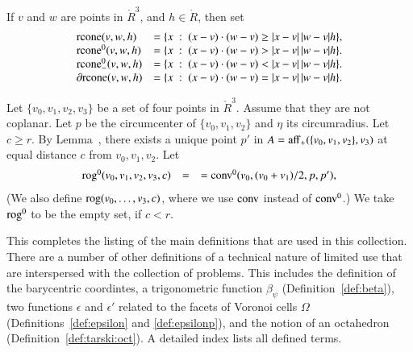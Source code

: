 \begin{tarskidata}
\begin{tarski}
\begin{definition}[rcone] 
If $v$ and $w$ are points in $\ring{R}^3$, and
  $h\in\ring{R}$, then set
  $$\begin{array}{lll}
    {\operatorname{rcone}}(v,w,h) &= \{x\ :\  (x-v)\cdot (w-v) \ge |x-v|\,|w-v| h\},\\
    {\operatorname{rcone}}^0(v,w,h) &= \{x\ :\  (x-v)\cdot (w-v) > |x-v|\,|w-v| h\}.\\
    {\operatorname{rcone}}_-^0(v,w,h) &= \{x\ :\  (x-v)\cdot (w-v) < |x-v|\,|w-v| h\}.\\
    \partial{\operatorname{rcone}}(v,w,h) &= \{x\ :\  (x-v)\cdot (w-v) = |x-v|\,|w-v| h\}.\\
    \end{array}
    $$
\end{definition}
\end{tarski}


\begin{tarski}

\begin{definition} 
Let $\{v_0,v_1,v_2,v_3\}$ be a set of four points in $\ring{R}^3$.
Assume that they are not coplanar.  Let $p$ be the circumcenter
of $\{v_0,v_1,v_2\}$ and $\eta$ its circumradius.  Let $c\ge r$.
By Lemma~, there exists a unique
point $p'$ in $A={\operatorname{aff}}_+(\{v_0,v_1,v_2\},v_3)$ at equal distance $c$
from $v_0,v_1,v_2$.
Let $$
    \begin{array}{rll}
    {\operatorname{rog}}^0(v_0,v_1,v_2,v_3,c) &= 
    &= {\operatorname{conv}}^0(v_0,(v_0+v_1)/2,p,p'),\\
    \end{array}
    $$
(We also define ${\operatorname{rog}}(v_0,\ldots,v_3,c)$, where we use
${\operatorname{conv}}$ instead of ${\operatorname{conv}}^0$.)
We take ${\operatorname{rog}}^0$ to be the empty set, if $c< r$.
\end{definition}
This completes the listing of the main definitions that
are used in this collection.  There are a number of other
definitions of a technical nature of limited use that
are interspersed with the collection of problems.
This includes the definition of the barycentric coordintes,
a trigonometric function $\beta_\psi$ (Definition~\ref{def:beta}),
two functions $\epsilon$ and $\epsilon'$ related to the
facets of Voronoi cells $\Omega$ (Definitions~\ref{def:epsilon}
and \ref{def:epsilonp}), and the notion of an octahedron
(Definition~\ref{def:tarski:oct}).  A detailed index lists
all defined terms.
\end{tarski}











\end{tarskidata}
